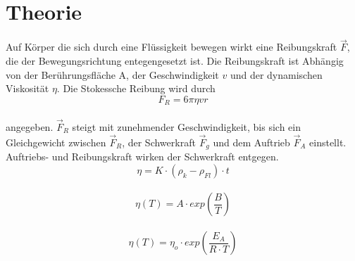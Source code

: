 \section{Theorie}
\label{sec:Theorie}

Auf Körper die sich durch eine Flüssigkeit bewegen wirkt eine Reibungskraft $\vec{F}$,
die der Bewegungsrichtung entegengesetzt ist. Die Reibungskraft ist Abhängig von der Berührungsfläche A,
der Geschwindigkeit $v$ und der dynamischen Viskosität $η$.
Die Stokessche Reibung wird durch 
\\
\begin{equation}
    F_{R} = 6πηvr
\end{equation}
\\
angegeben. $\vec{F}_R$ steigt mit zunehmender Geschwindigkeit, bis sich ein Gleichgewicht zwischen $\vec{F}_R$, der Schwerkraft $\vec{F}_g$ 
und dem Auftrieb $\vec{F}_A$ einstellt. Auftriebs- und Reibungskraft wirken der Schwerkraft entgegen.
\\
\begin{equation}
η = K \cdot (ρ_k - ρ_{Fl}) \cdot t
\end{equation}
\\
\begin{equation}
η(T) = A \cdot exp \left(\frac{B}{T}\right)
\label{eqn:AndradscheGl}
\end{equation}
\\
\begin{equation}
η(T) = η_o \cdot exp \left(\frac{E_A}{R\cdot T}\right)
\end{equation}

